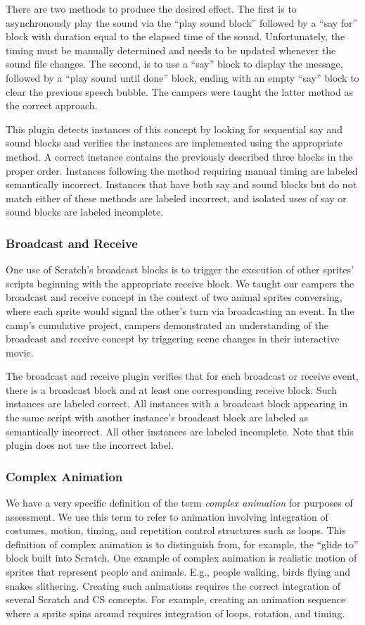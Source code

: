 There are two methods to produce the desired effect.  The first is to
asynchronously play the sound via the ``play sound block'' followed by a ``say
for'' block with duration equal to the elapsed time of the sound.
Unfortunately, the timing must be manually determined and needs to be updated
whenever the sound file changes.  The second, is to use a ``say'' block to
display the message, followed by a ``play sound until done'' block, ending with
an empty ``say'' block to clear the previous speech bubble. The campers were
taught the latter method as the correct approach.

This plugin detects instances of this concept by looking for sequential say and
sound blocks and verifies the instances are implemented using the appropriate
method.  A correct instance contains the previously described three blocks in
the proper order.  Instances following the method requiring manual timing are
labeled semantically incorrect. Instances that have both say and sound blocks
but do not match either of these methods are labeled incorrect, and isolated
uses of say or sound blocks are labeled incomplete.


\subsubsection*{Broadcast and Receive}
One use of Scratch's broadcast blocks is to trigger the execution of other
sprites' scripts beginning with the appropriate receive block. We taught our
campers the broadcast and receive concept in the context of two animal sprites
conversing, where each sprite would signal the other's turn via broadcasting an
event. In the camp's cumulative project, campers demonstrated an understanding
of the broadcast and receive concept by triggering scene changes in their
interactive movie.

The broadcast and receive plugin verifies that for each broadcast or receive
event, there is a broadcast block and at least one corresponding receive
block. Such instances are labeled correct. All instances with a broadcast block
appearing in the same script with another instance's broadcast block are
labeled as semantically incorrect. All other instances are labeled
incomplete. Note that this plugin does not use the incorrect label.

\subsubsection*{Complex Animation}
We have a very specific definition of the term {\em complex animation} for
purposes of assessment.  We use this term to refer to animation involving
integration of costumes, motion, timing, and repetition control structures such
as loops. This definition of complex animation is to distinguish from, for
example, the ``glide to'' block built into Scratch.  One example of complex
animation is realistic motion of sprites that represent people and
animals. E.g., people walking, birds flying and snakes slithering.  Creating
such animations requires the correct integration of several Scratch and CS
concepts.  For example, creating an animation sequence where a sprite spins
around requires integration of loops, rotation, and timing.

